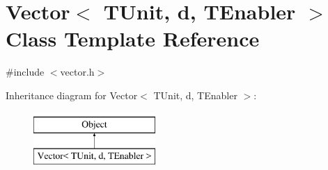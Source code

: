 \hypertarget{classVector}{}\section{Vector$<$ T\+Unit, d, T\+Enabler $>$ Class Template Reference}
\label{classVector}


{\ttfamily \#include $<$vector.\+h$>$}

Inheritance diagram for Vector$<$ T\+Unit, d, T\+Enabler $>$\+:\begin{figure}[H]
\begin{center}
\leavevmode
\includegraphics[height=2.000000cm]{classVector}
\end{center}
\end{figure}
